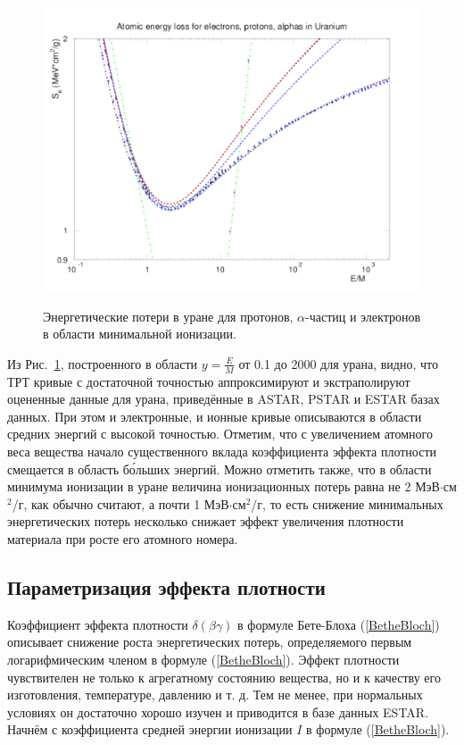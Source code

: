\documentclass[a4paper,12pt]{article}
\begin{document}
\begin{large}
  \begin{figure}[ht]
    {
       \includegraphics[width=0.99\linewidth]{images/epa_u_s}
    }
    \caption{Энергетические потери в уране для протонов, $\alpha$-частиц и электронов в области минимальной ионизации.}
    \label{fig:dEdxUS}
  \end{figure}
  Из Рис.~\ref{fig:dEdxUS}, построенного в области $y=\frac{E}{M}$ от 0.1 до 2000 для урана, видно, что ТРТ кривые с достаточной точностью аппроксимируют и экстраполируют оцененные данные для урана, приведённые в ASTAR, PSTAR и ESTAR базах данных.
  При этом и электронные, и ионные кривые описываются в области средних энергий с высокой точностью.
  Отметим, что с увеличением атомного веса вещества начало существенного вклада коэффициента эффекта плотности смещается в область б\'{о}льших энергий.
  Можно отметить также, что в области минимума ионизации в уране величина ионизационных потерь равна не 2 МэВ$\cdot$см$^2$/г, как обычно считают, а почти 1 МэВ$\cdot$см$^2$/г, то есть снижение минимальных энергетических потерь несколько снижает эффект увеличения плотности материала при росте его атомного номера.

\subsection{Параметризация эффекта плотности}
\label{dEdx2}

  Коэффициент эффекта плотности $\delta(\beta\gamma)$ в формуле Бете-Блоха (\ref{BetheBloch}) описывает снижение роста энергетических потерь, определяемого первым логарифмическим членом в формуле (\ref{BetheBloch}). Эффект плотности чувствителен не только к агрегатному состоянию вещества, но и к качеству его изготовления, температуре, давлению и т. д. Тем не менее, при нормальных условиях он достаточно хорошо изучен и приводится в базе данных ESTAR.
   Начнём с коэффициента средней энергии ионизации $I$ в формуле (\ref{BetheBloch}).


\end{large}
\end{document}
